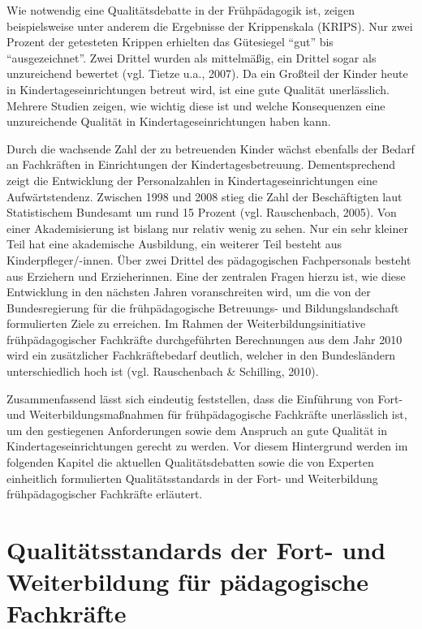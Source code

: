 \documentclass[12pt,a4paper]{article}
\begin{document}
Wie notwendig eine Qualitätsdebatte in der Frühpädagogik ist, zeigen beispielsweise unter anderem die Ergebnisse der Krippenskala (KRIPS). Nur zwei Prozent der getesteten Krippen erhielten das Gütesiegel "`gut"' bis "`ausgezeichnet"'. Zwei Drittel wurden als mittelmäßig, ein Drittel sogar als unzureichend bewertet (vgl. Tietze u.a., 2007). Da ein Großteil der Kinder heute in Kindertageseinrichtungen betreut wird, ist eine gute Qualität unerlässlich. Mehrere Studien zeigen, wie wichtig diese ist und welche Konsequenzen eine unzureichende Qualität in Kindertageseinrichtungen haben kann.

Durch die wachsende Zahl der zu betreuenden Kinder wächst ebenfalls der Bedarf an Fachkräften in Einrichtungen der Kindertagesbetreuung. Dementsprechend zeigt die Entwicklung der Personalzahlen in Kindertageseinrichtungen eine Aufwärtstendenz. Zwischen 1998 und 2008 stieg die Zahl der Beschäftigten laut Statistischem Bundesamt um rund 15 Prozent (vgl. Rauschenbach, 2005). Von einer Akademisierung ist bislang nur relativ wenig zu sehen. Nur ein sehr kleiner Teil hat eine akademische Ausbildung, ein weiterer Teil besteht aus Kinderpfleger/-innen. Über zwei Drittel des pä\-da\-go\-gi\-schen Fachpersonals besteht aus Erziehern und Erzieherinnen. Eine der zentralen Fragen hierzu ist, wie diese Entwicklung in den nächsten Jahren voranschreiten wird, um die von der Bundesregierung für die frühpädagogische Betreuungs- und Bildungslandschaft formulierten Ziele zu erreichen. Im Rahmen der Weiterbildungsinitiative frühpädagogischer Fachkräfte durch\-ge\-führ\-ten Berechnungen aus dem Jahr 2010 wird ein zusätzlicher Fachkräftebedarf deutlich, welcher in den Bundesländern unterschiedlich hoch ist (vgl. Rauschenbach \& Schilling, 2010). 

Zusammenfassend lässt sich eindeutig feststellen, dass die Einführung von Fort- und Weiterbildungsmaßnahmen für früh\-pä\-da\-go\-gische Fachkräfte unerlässlich ist, um den gestiegenen Anforderungen sowie dem Anspruch an gute Qualität in Kindertageseinrichtungen gerecht zu werden. Vor diesem Hintergrund werden im folgenden Kapitel die aktuellen Qualitätsdebatten sowie die von Experten einheitlich formulierten Qualitätsstandards in der Fort- und Weiterbildung frühpädagogischer Fach\-kräf\-te erläutert. 

 \section{Qualitätsstandards der Fort- und Weiterbildung für pädagogische Fachkräfte}
 
\end{document}
